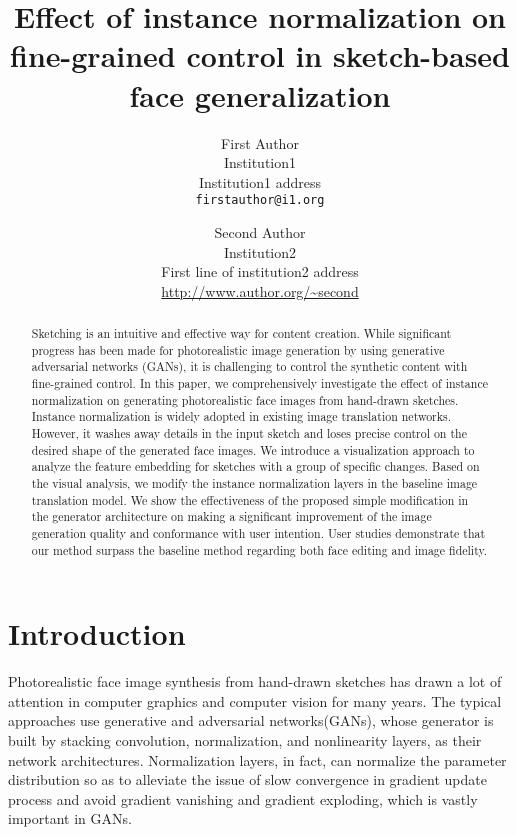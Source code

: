 \documentclass[10pt,twocolumn,letterpaper]{article}
\begin{document}
\title{Effect of instance normalization on fine-grained control in sketch-based face generalization}

\author{First Author\\
Institution1\\
Institution1 address\\
{\tt\small firstauthor@i1.org}
\and
Second Author\\
Institution2\\
First line of institution2 address\\
{\small\url{http://www.author.org/~second}}
}

\maketitle

\begin{abstract}
	Sketching is an intuitive and effective way for content creation. While significant progress has been made for photorealistic image generation by using generative adversarial networks (GANs), it is challenging to control the synthetic content with fine-grained control.  
	In this paper, we comprehensively investigate the effect of instance normalization on generating photorealistic face images from hand-drawn sketches.
	Instance normalization is widely adopted in existing image translation networks. However, it washes away details in the input sketch and loses precise control on the desired shape of the generated face images. 
	We introduce a visualization approach to analyze the feature embedding for sketches with a group of specific changes.  
	Based on the visual analysis, we modify the instance normalization layers in the baseline image translation model. 
	We show the effectiveness of the proposed simple modification in the generator architecture on making a significant improvement of the image generation quality and conformance with user intention. 
	User studies demonstrate that our method surpass the baseline method regarding both face editing and image fidelity.    
\end{abstract}

\section{Introduction}
Photorealistic face image synthesis from hand-drawn sketches has drawn a lot of attention in computer graphics and computer vision for many years. The typical approaches use generative and adversarial networks(GANs)\cite{gan}, whose generator is built by stacking convolution, normalization, and nonlinearity layers, as their network architectures. Normalization layers, in fact, can normalize the parameter distribution so as to alleviate the issue of slow convergence in gradient update process and avoid gradient vanishing and gradient exploding,  which is vastly important in GANs.
\end{document}

